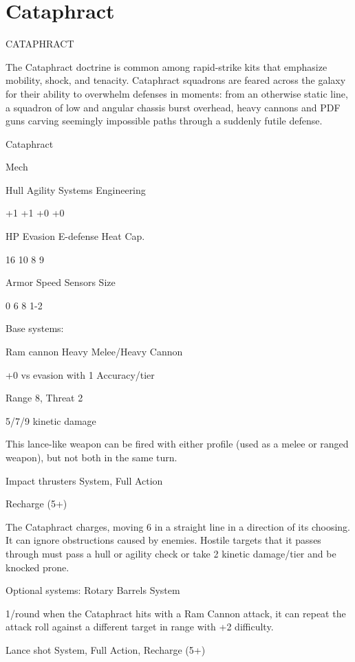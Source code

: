 \section{Cataphract}
                                            CATAPHRACT

The Cataphract doctrine is common among rapid-strike kits that emphasize mobility, shock, and
tenacity. Cataphract squadrons are feared across the galaxy for their ability to overwhelm
defenses in moments: from an otherwise static line, a squadron of low and angular chassis burst
overhead, heavy cannons and PDF guns carving seemingly impossible paths through a suddenly
futile defense.


 Cataphract

 Mech

 Hull       Agility      Systems       Engineering

 +1         +1           +0            +0

 HP         Evasion      E-defense     Heat Cap.

 16         10           8             9

 Armor      Speed        Sensors       Size

 0          6            8             1-2

Base systems:

Ram cannon
Heavy Melee/Heavy Cannon

+0 vs evasion with 1 Accuracy/tier

Range 8, Threat 2

5/7/9 kinetic damage

This lance-like weapon can be fired with either profile (used as a melee or ranged weapon), but
not both in the same turn.


Impact thrusters
System, Full Action

Recharge (5+)

The Cataphract charges, moving 6 in a straight line in a direction of its choosing. It can ignore
obstructions caused by enemies. Hostile targets that it passes through must pass a hull or agility
check or take 2 kinetic damage/tier and be knocked prone.


Optional systems:
Rotary Barrels
System

1/round when the Cataphract hits with a Ram Cannon attack, it can repeat the attack roll against
a different target in range with +2 difficulty.





Lance shot
System, Full Action, Recharge (5+)

